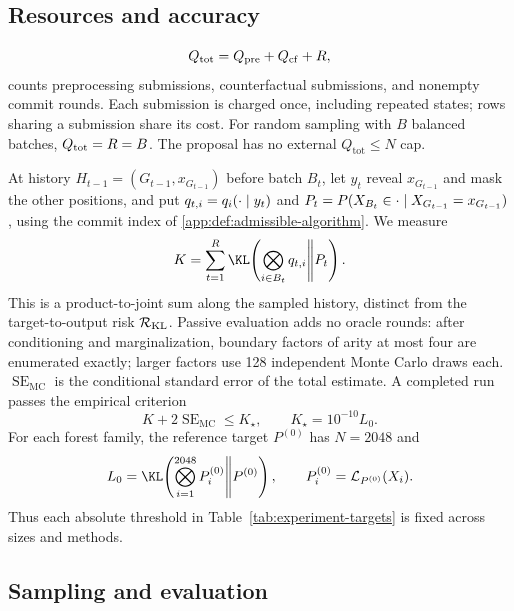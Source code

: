 \subsection{Resources and accuracy}
\label{app:experiment-accuracy}

\begin{equation}
 Q_{\mathrm{tot}}=Q_{\mathrm{pre}}+\CounterfactualQueries+\CommitRounds,
 \label{app:eq:experiment-total-rounds}
\end{equation}
counts preprocessing submissions, counterfactual submissions, and nonempty
commit rounds. Each submission is charged once, including repeated states;
rows sharing a submission share its cost. For random sampling with $B$
balanced batches, $Q_{\mathrm{tot}}=\CommitRounds=B$.
The proposal has no external $Q_{\mathrm{tot}}\le N$ cap.

At history $H_{t-1}=(G_{t-1},x_{G_{t-1}})$ before batch $B_t$, let $y_t$ reveal
$x_{G_{t-1}}$ and mask the other positions, and put
$q_{t,i}=\OracleRow{y_t}{i}$ and
$P_t=\TargetLaw(X_{B_t}\in\cdot\mid X_{G_{t-1}}=x_{G_{t-1}})$,
using the commit index of \cref{app:def:admissible-algorithm}. We measure
\begin{equation}
 K=\sum_{t=1}^{\CommitRounds}
 \KLDivergence{\bigotimes_{i\in B_t}q_{t,i}}{P_t}.
 \label{app:eq:experiment-kl}
\end{equation}
This is a product-to-joint sum along the sampled history, distinct from
the target-to-output risk $\KLSeedRisk$.
Passive evaluation adds no oracle rounds: after conditioning and
marginalization, boundary factors of arity at most four are enumerated
exactly; larger factors use 128 independent Monte Carlo draws each.
$\operatorname{SE}_{\mathrm{MC}}$ is the conditional standard error of
the total estimate. A completed run passes the empirical criterion
\begin{equation}
 K+2\operatorname{SE}_{\mathrm{MC}}\le K_\star,
 \qquad K_\star=10^{-10}L_0.
 \label{app:eq:experiment-accuracy}
\end{equation}
For each forest family, the reference target $P^{(0)}$ has $N=2048$ and
\begin{equation}
 L_0=\KLDivergence{\bigotimes_{i=1}^{2048}P_i^{(0)}}{P^{(0)}},
 \qquad P_i^{(0)}=\mathcal L_{P^{(0)}}(X_i).
 \label{app:eq:experiment-reference-kl}
\end{equation}
Thus each absolute threshold in Table~\ref{tab:experiment-targets}
is fixed across sizes and methods.

\subsection{Sampling and evaluation}
\label{app:experiment-proposal}

